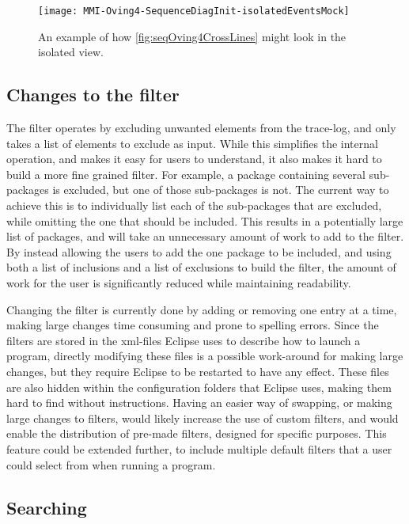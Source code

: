 \begin{figure}[H]
	\centering
	\texttt{[image: MMI-Oving4-SequenceDiagInit-isolatedEventsMock]}
	\caption{An example of how \cref{fig:seqOving4CrossLines} might look in the isolated view.}
	\label{fig:seqOving4IsolatedMock}
\end{figure}


\subsection{Changes to the filter}\label{jiveSuggestionsFilter}

The filter operates by excluding unwanted elements from the trace-log, and only takes a list of elements to exclude as input.
While this simplifies the internal operation, and makes it easy for users to understand, it also makes it hard to build a more fine grained filter.
For example, a package containing several sub-packages is excluded, but one of those sub-packages is not.
The current way to achieve this is to individually list each of the sub-packages that are excluded, while omitting the one that should be included.
This results in a potentially large list of packages, and will take an unnecessary amount of work to add to the filter.
By instead allowing the users to add the one package to be included, and using both a list of inclusions and a list of exclusions to build the filter, the amount of work for the user is significantly reduced while maintaining readability.

Changing the filter is currently done by adding or removing one entry at a time, making large changes time consuming and prone to spelling errors.
Since the filters are stored in the \gls{xml}-files Eclipse uses to describe how to launch a program, directly modifying these files is a possible work-around for making large changes, but they require Eclipse to be restarted to have any effect.
These files are also hidden within the configuration folders that Eclipse uses, making them hard to find without instructions.
Having an easier way of swapping, or making large changes to filters, would likely increase the use of custom filters, and would enable the distribution of pre-made filters, designed for specific purposes.
This feature could be extended further, to include multiple default filters that a user could select from when running a program.



\subsection{Searching}\label{jiveSuggestionsSearch}

